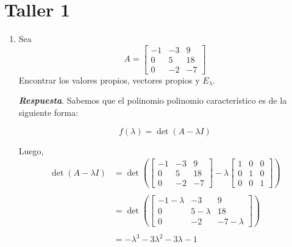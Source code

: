 \documentclass{report}
\begin{document}

    \pagebreak
    \section*{Taller 1}

    \begin{enumerate}
        \item Sea
        $$A = \begin{bmatrix}
            -1 & -3 & 9\\
            0 & 5 & 18\\
            0 & -2 & -7
        \end{bmatrix}$$
        Encontrar los valores propios, vectores propios y $E_\lambda$.

        \textit{\textbf{Respuesta}}. Sabemos que el polinomio polinomio característico es de la siguiente forma:

        $$f(\lambda) = \det\left(A - \lambda I\right)$$

        Luego, \begin{align*}
            \det\left(A - \lambda I\right) &= \det\left(
                \begin{bmatrix}
                    -1 & -3 & 9\\
                    0 & 5 & 18\\
                    0 & -2 & -7
                \end{bmatrix}
            - \lambda
                \begin{bmatrix}
                    1 & 0 & 0\\
                    0 & 1 & 0\\
                    0 & 0 & 1
                \end{bmatrix}
            \right)\\\\
            &= \det\left(
                \begin{bmatrix}
                    -1-\lambda & -3 & 9\\
                    0 & 5-\lambda & 18\\
                    0 & -2 & -7-\lambda
                \end{bmatrix}
            \right)\\\\
            &= -\lambda^3 -3\lambda^2 -3\lambda -1
        \end{align*}


\end{enumerate}
\end{document}
